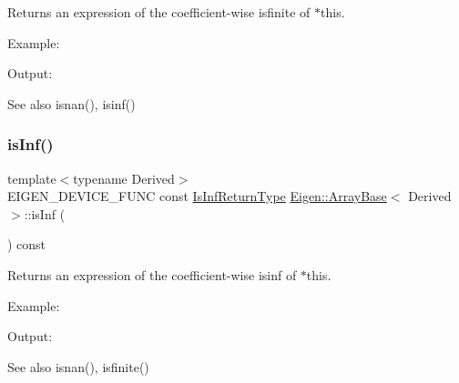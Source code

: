 \begin{DoxyReturn}{Returns}
an expression of the coefficient-\/wise isfinite of $\ast$this.
\end{DoxyReturn}
Example\+: 
\begin{DoxyCodeInclude}{0}
\end{DoxyCodeInclude}
 Output\+: 
\begin{DoxyVerbInclude}
\end{DoxyVerbInclude}


\begin{DoxySeeAlso}{See also}
isnan(), isinf() 
\end{DoxySeeAlso}
\mbox{\label{class_eigen_1_1_array_base_ac35a8119b6fa65e1780e0845a8c4c141}} 
\subsubsection{\texorpdfstring{isInf()}{isInf()}}
{\footnotesize\ttfamily template$<$typename Derived$>$ \\
E\+I\+G\+E\+N\+\_\+\+D\+E\+V\+I\+C\+E\+\_\+\+F\+U\+NC const \mbox{\hyperlink{class_eigen_1_1_cwise_unary_op}{Is\+Inf\+Return\+Type}} \mbox{\hyperlink{class_eigen_1_1_array_base}{Eigen\+::\+Array\+Base}}$<$ Derived $>$\+::is\+Inf (\begin{DoxyParamCaption}{ }\end{DoxyParamCaption}) const\hspace{0.3cm}{\ttfamily [inline]}}

\begin{DoxyReturn}{Returns}
an expression of the coefficient-\/wise isinf of $\ast$this.
\end{DoxyReturn}
Example\+: 
\begin{DoxyCodeInclude}{0}
\end{DoxyCodeInclude}
 Output\+: 
\begin{DoxyVerbInclude}
\end{DoxyVerbInclude}


\begin{DoxySeeAlso}{See also}
isnan(), isfinite() 
\end{DoxySeeAlso}
\mbox{\label{class_eigen_1_1_array_base_a683843fca0a48ae0d39374ec8890aac9}} 
